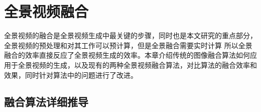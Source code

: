 \chapter{全景视频融合}
全景视频的融合是全景视频生成中最关键的步骤，同时也是本文研究的重点部分，全景视频的预处理和对其工作可以预计算，但是全景融合需要实时计算
所以全景融合的效率直接反应了全景视频生成的效率。本章介绍传统的图像融合算法如何应用于全景视频的生成，以及现有的两种全景视频融合算法，对比算法的融合效率和效果，同时针对算法中的问题进行了改进。

\section{融合算法详细推导}

